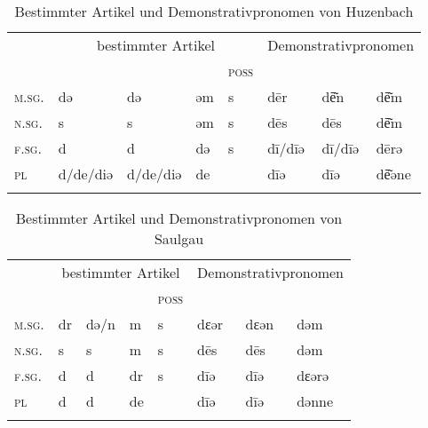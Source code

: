 \begin{table}[H]
	\caption{Bestimmter Artikel und Demonstrativpronomen von Huzenbach \citep[100, 104-105]{Baur1967}}\label{table92}
	\begin{tabular}{llllllll}
		\lsptoprule
		& \multicolumn{4}{c}{bestimmter Artikel} & \multicolumn{3}{c}{Demonstrativpronomen} \\\cmidrule(lr){2-5}\cmidrule(lr){6-8}
		& \NOM & \AKK & \DAT & \textsc{poss} & \NOM & \AKK & \DAT\\\midrule
		\textsc{m.sg.} & dǝ & dǝ & ǝm & s & d\=er & d\=e͂n & d\=e͂m\\
		\textsc{n.sg.} & s & s & ǝm & s & d\=es & d\=es & d\=e͂m\\
		\textsc{f.sg.} & d & d & dǝ & s & d\=i/d\=iǝ & d\=i/d\=iǝ & d\=erǝ\\
		\textsc{pl} & d/de/diǝ & d/de/diǝ & de &  & d\=iǝ & d\=iǝ & d\=e͂əne\\
		\lspbottomrule
	\end{tabular}
\end{table}


\begin{table}[H]
	\caption{Bestimmter Artikel und Demonstrativpronomen von Saulgau \citep[115-116, 119-120]{Raichle1932}}\label{table93}
	\begin{tabular}{llllllll}
		\lsptoprule
		& \multicolumn{4}{c}{bestimmter Artikel}  & \multicolumn{3}{c}{Demonstrativpronomen} \\\cmidrule(lr){2-5}\cmidrule(lr){6-8}
		& \NOM & \AKK & \DAT & \textsc{poss} & \NOM & \AKK & \DAT\\\midrule
		\textsc{m.sg.} & dr & dǝ/n & m & s & dɛǝr & dɛǝn & dǝm\\
		\textsc{n.sg.} & s & s & m & s & d\=es & d\=es & dǝm\\
		\textsc{f.sg.} & d & d & dr & s & d\=iǝ & d\=iǝ & dɛǝrǝ\\
		\textsc{pl} & d & d & de &  & d\=iǝ & d\=iǝ & dǝnne\\
		\lspbottomrule
	\end{tabular}
\end{table}


